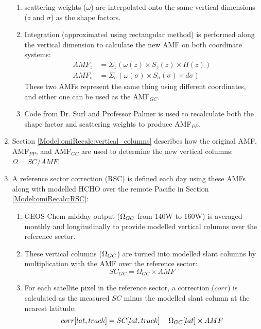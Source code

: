 \begin{enumerate}
\begin{enumerate}
        \item scattering weights ($\omega$) are interpolated onto the same vertical dimensions (\textit{z} and $\sigma$) as the shape factors.
        \item Integration (approximated using rectangular method) is performed along the vertical dimension to calculate the new AMF on both coordinate systems:
        \begin{align}
          AMF_z &= \Sigma_z \left(\omega(z) \times S_z(z) \times H(z)\right) \\
          AMF_{\sigma} &= \Sigma_{\sigma} \left(\omega(\sigma) \times S_{\sigma}(\sigma) \times d\sigma \right)
        \end{align}
        These two AMFs represent the same thing using different coordinates, and either one can be used as the AMF$_{GC}$.
        \item Code from Dr. Surl and Professor Palmer is used to recalculate both the shape factor and scattering weights to produce AMF$_{PP}$.
      \end{enumerate}
      \item Section \ref{Model:omiRecalc:vertical_columns} describes how the original AMF, AMF$_{PP}$, and AMF$_{GC}$ are used to determine the new vertical columns: $\Omega = SC/AMF$.
      \item A reference sector correction (RSC) is defined each day using these AMFs along with modelled HCHO over the remote Pacific in Section \ref{Model:omiRecalc:RSC}:
      \begin{enumerate}
        \item GEOS-Chem midday output ($\Omega_{GC}$ from 140{\degr}W to 160{\degr}W) is averaged monthly and longitudinally to provide modelled vertical columns over the reference sector.
        \item These vertical columns ($\Omega_{GC}$) are turned into modelled slant columns by multiplication with the AMF over the reference sector:
        \begin{equation*}
          SC_{GC} = \Omega_{GC} \times AMF
        \end{equation*}
        \item For each satellite pixel in the reference sector, a correction ($corr$) is calculated as the measured $SC$ minus the modelled slant column at the nearest latitude:
        \begin{equation*}
          corr[lat,track] = SC[lat,track] - \Omega_{GC}[lat] \times AMF
        \end{equation*}

\end{enumerate}
\end{enumerate}
